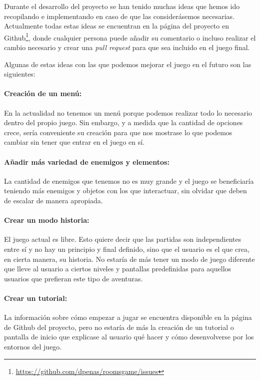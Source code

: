Durante el desarrollo del proyecto se han tenido muchas ideas que hemos ido recopilando e implementando en caso de que las considerásemos necesarias. Actualmente todas estas ideas se encuentran en la página del proyecto en Github\footnote{\url{https://github.com/dpenas/roomsgame/issues}}, donde cualquier persona puede añadir su comentario o incluso realizar el cambio necesario y crear una \textit{pull request} para que sea incluido en el juego final.

Algunas de estas ideas con las que podemos mejorar el juego en el futuro son las siguientes: 

\paragraph{Creación de un menú:} En la actualidad no tenemos un menú porque podemos realizar todo lo necesario dentro del propio juego. Sin embargo, y a medida que la cantidad de opciones crece, sería conveniente su creación para que nos mostrase lo que podemos cambiar sin tener que entrar en el juego en sí.

\paragraph{Añadir más variedad de enemigos y elementos:} La cantidad de enemigos que tenemos no es muy grande y el juego se beneficiaría teniendo más enemigos y objetos con los que interactuar, sin olvidar que deben de escalar de manera apropiada.

\paragraph{Crear un modo historia:} El juego actual es libre. Esto quiere decir que las partidas son independientes entre sí y no hay un principio y final definido, sino que el usuario es el que crea, en cierta manera, su historia. 
No estaría de más tener un modo de juego diferente que lleve al usuario a ciertos niveles y pantallas predefinidas para aquellos usuarios que prefieran este tipo de aventuras.

\paragraph{Crear un tutorial:} La información sobre cómo empezar a jugar se encuentra disponible en la página de Github del proyecto, pero no estaría de más la creación de un tutorial o pantalla de inicio que explicase al usuario qué hacer y cómo desenvolverse por los entornos del juego.

